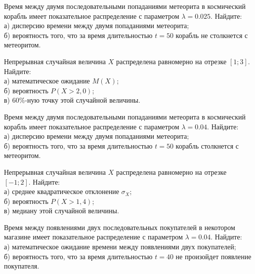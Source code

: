 \vfill

\z Время между двумя последовательными попаданиями метеорита в космический корабль имеет показательное распределение с параметром $\lambda = 0.025$. Найдите: \\ \quad а) дисперсию времени между двумя попаданиями метеорита; \\ \quad б) вероятность того, что за время длительностью $t = 50$ корабль не столкнется с метеоритом.
 

\vfill

\newpage\setcounter{zad}{0}

\z Непрерывная случайная величина $X$ распределена равномерно на отрезке $[1; 3]$. Найдите: \\ \quad а) математическое ожидание $M(X)$; \\ \quad б) вероятность $P(X>2{,}0)$; \\ \quad в) $60\%$-ную точку этой случайной величины.


\vfill

\z Время между двумя последовательными попаданиями метеорита в космический корабль имеет показательное распределение с параметром $\lambda = 0.04$. Найдите: \\ \quad а) дисперсию времени между двумя попаданиями метеорита; \\ \quad б) вероятность того, что за время длительностью $t = 50$ корабль  столкнется с метеоритом.
 

\vfill

\newpage\setcounter{zad}{0}

\z Непрерывная случайная величина $X$ распределена равномерно на отрезке $[-1; 2]$. Найдите: \\ \quad а) среднее квадратическое отклонение $\sigma_X$; \\ \quad б) вероятность $P(X>1{,}4)$; \\ \quad в) медиану этой случайной величины.


\vfill

\z Время между появлениями двух последовательных покупателей в некотором магазине имеет показательное распределение с параметром $\lambda = 0.04$. Найдите: \\ \quad а) математическое ожидание времени между появлениями двух покупателей; \\ \quad б) вероятность того, что за время длительностью $t = 40$ не произойдет появление покупателя.
 

\vfill

\newpage\setcounter{zad}{0}

